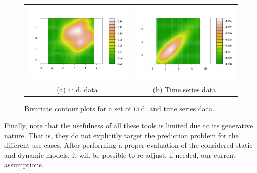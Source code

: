 \begin{itemize}
\begin{figure} [ht!]
\begin{center}
\begin{tabular}{cc}
\includegraphics[scale=0.25]{./figures/PreliminariesBivariateGaussian} &
\includegraphics[scale=0.25]{./figures/PreliminariesBivariateTimeSerie} \\
(a) i.i.d. data & (b)  Time series data \\
\end{tabular}
\caption{\label{Figure:PreliminariesBivariates}Bivariate contour plots for a set of i.i.d. and time series data. 
}
\end{center}
\end{figure}

\end{itemize}

Finally, note that the usefulness of all these tools is limited due to its generative nature. That is, they do not explicitly target the prediction problem for the different use-cases. After performing a proper evaluation of the considered static and dynamic models, it will be possible to re-adjust, if needed, our current assumptions. 